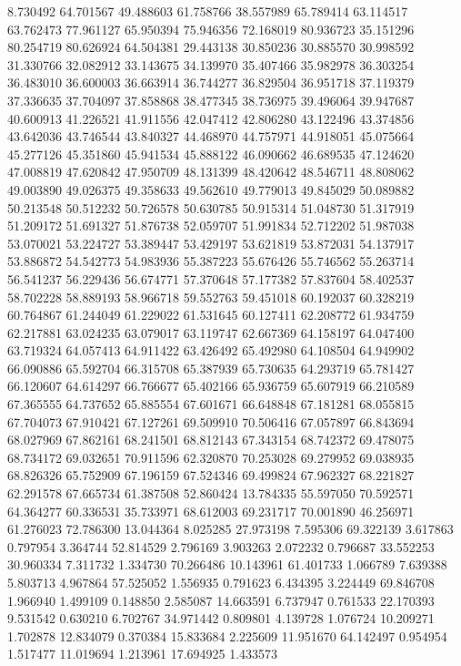8.730492
64.701567
49.488603
61.758766
38.557989
65.789414
63.114517
63.762473
77.961127
65.950394
75.946356
72.168019
80.936723
35.151296
80.254719
80.626924
64.504381
29.443138
30.850236
30.885570
30.998592
31.330766
32.082912
33.143675
34.139970
35.407466
35.982978
36.303254
36.483010
36.600003
36.663914
36.744277
36.829504
36.951718
37.119379
37.336635
37.704097
37.858868
38.477345
38.736975
39.496064
39.947687
40.600913
41.226521
41.911556
42.047412
42.806280
43.122496
43.374856
43.642036
43.746544
43.840327
44.468970
44.757971
44.918051
45.075664
45.277126
45.351860
45.941534
45.888122
46.090662
46.689535
47.124620
47.008819
47.620842
47.950709
48.131399
48.420642
48.546711
48.808062
49.003890
49.026375
49.358633
49.562610
49.779013
49.845029
50.089882
50.213548
50.512232
50.726578
50.630785
50.915314
51.048730
51.317919
51.209172
51.691327
51.876738
52.059707
51.991834
52.712202
51.987038
53.070021
53.224727
53.389447
53.429197
53.621819
53.872031
54.137917
53.886872
54.542773
54.983936
55.387223
55.676426
55.746562
55.263714
56.541237
56.229436
56.674771
57.370648
57.177382
57.837604
58.402537
58.702228
58.889193
58.966718
59.552763
59.451018
60.192037
60.328219
60.764867
61.244049
61.229022
61.531645
60.127411
62.208772
61.934759
62.217881
63.024235
63.079017
63.119747
62.667369
64.158197
64.047400
63.719324
64.057413
64.911422
63.426492
65.492980
64.108504
64.949902
66.090886
65.592704
66.315708
65.387939
65.730635
64.293719
65.781427
66.120607
64.614297
66.766677
65.402166
65.936759
65.607919
66.210589
67.365555
64.737652
65.885554
67.601671
66.648848
67.181281
68.055815
67.704073
67.910421
67.127261
69.509910
70.506416
67.057897
66.843694
68.027969
67.862161
68.241501
68.812143
67.343154
68.742372
69.478075
68.734172
69.032651
70.911596
62.320870
70.253028
69.279952
69.038935
68.826326
65.752909
67.196159
67.524346
69.499824
67.962327
68.221827
62.291578
67.665734
61.387508
52.860424
13.784335
55.597050
70.592571
64.364277
60.336531
35.733971
68.612003
69.231717
70.001890
46.256971
61.276023
72.786300
13.044364
8.025285
27.973198
7.595306
69.322139
3.617863
0.797954
3.364744
52.814529
2.796169
3.903263
2.072232
0.796687
33.552253
30.960334
7.311732
1.334730
70.266486
10.143961
61.401733
1.066789
7.639388
5.803713
4.967864
57.525052
1.556935
0.791623
6.434395
3.224449
69.846708
1.966940
1.499109
0.148850
2.585087
14.663591
6.737947
0.761533
22.170393
9.531542
0.630210
6.702767
34.971442
0.809801
4.139728
1.076724
10.209271
1.702878
12.834079
0.370384
15.833684
2.225609
11.951670
64.142497
0.954954
1.517477
11.019694
1.213961
17.694925
1.433573
